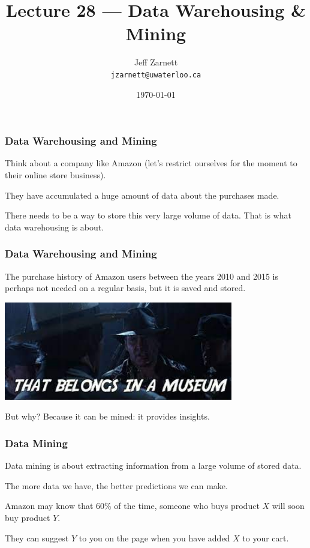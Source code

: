 

\title{Lecture 28 --- Data Warehousing \& Mining }

\author{Jeff Zarnett \\ \small \texttt{jzarnett@uwaterloo.ca}}
\date{\today}




\begin{frame}
  \titlepage

 \end{frame}
 
 
\begin{frame}
\frametitle{Data Warehousing and Mining}

Think about a company like Amazon (let's restrict ourselves for the moment to their online store business). 

They have accumulated a huge amount of data about the purchases made. 

There needs to be a way to store this very large volume of data. That is what data \alert{warehousing} is about. 
 \end{frame}
 
 
\begin{frame}
\frametitle{Data Warehousing and Mining}


The purchase history of Amazon users between the years 2010 and 2015 is perhaps not needed on a regular basis, but it is saved and stored. 

\begin{center}
	\includegraphics[width=0.75\textwidth]{images/museum.jpg}
\end{center}

But why? Because it can be \alert{mined}: it provides insights.

\end{frame}

\begin{frame}
\frametitle{Data Mining}

\alert{Data mining} is about extracting information from a large volume of stored data.  

The more data we have, the better predictions we can make. 

Amazon may know that 60\% of the time, someone who buys product $X$ will soon buy product $Y$.

They can suggest $Y$ to you on the page when you have added $X$ to your cart.


\end{frame}


